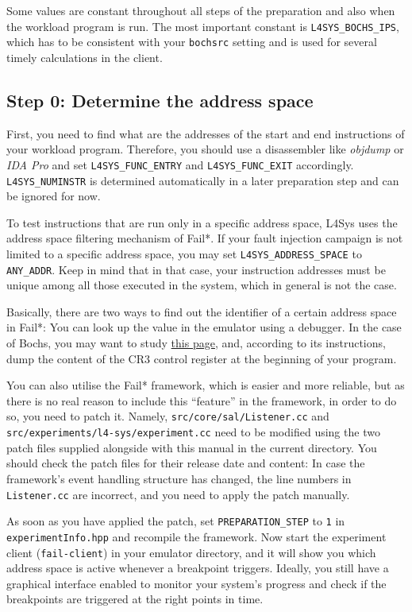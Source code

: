 \documentclass[a4paper,10pt]{article}
\begin{document}
Some values are constant throughout all steps of the preparation
and also when the workload program is run.
The most important constant is \verb+L4SYS_BOCHS_IPS+,
which has to be consistent with your \texttt{bochsrc} setting
and is used for several timely calculations in the client.

\subsection{Step 0: Determine the address space}

First, you need to find what are the addresses of the
start and end instructions of your
workload program. Therefore, you should use a
disassembler like \emph{objdump} or \emph{IDA Pro} and
set \verb+L4SYS_FUNC_ENTRY+ and \verb+L4SYS_FUNC_EXIT+
accordingly. \verb+L4SYS_NUMINSTR+
is determined automatically in a later preparation step and
can be ignored for now.

To test instructions that are run only in a specific address space,
L4Sys uses the address space filtering mechanism of Fail*.
If your fault injection campaign is not limited to a specific address space,
you may set \verb+L4SYS_ADDRESS_SPACE+ to \verb+ANY_ADDR+. Keep in mind that in
that case, your instruction addresses must be unique among all those
executed in the system, which in general is not the case.

Basically, there are two ways to find out the identifier of a certain
address space in Fail*: You can look up the value in
the emulator using a debugger. In the case of Bochs, you may want to
study
\href{http://bochs.sourceforge.net/doc/docbook/user/internal-debugger.html}{this page},
and, according to its instructions,
dump the content of the CR3 control register at the
beginning of your program.

You can also utilise the Fail* framework, which is easier and more reliable,
but as there is no real reason to include this ``feature'' in the framework,
in order to do so, you need to patch it. Namely,
\texttt{src/core/sal/Listener.cc} and
\texttt{src/experiments/l4-sys/experiment.cc}
need to be modified using the two patch files supplied alongside with this
manual in the current directory.
You should check the patch files for their release date and content:
In case the framework's
event handling structure has changed, the line numbers in
\texttt{Listener.cc} are incorrect,
and you need to apply the patch manually.

As soon as you have applied the patch, set \verb+PREPARATION_STEP+
to \texttt{1} in \texttt{experimentInfo.hpp} and recompile the framework.
Now start the experiment client (\texttt{fail-client}) in your
emulator directory, and
it will show you which address space is active whenever a
breakpoint triggers.
Ideally, you still have a graphical interface enabled to
monitor your system's progress and check if the breakpoints
are triggered at the right points in time.
\end{document}
